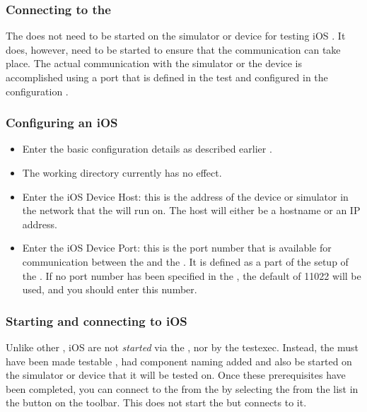 

\subsubsection{Connecting to the \gdagent{}}
The \gdagent{} does not need to be started on the simulator or device for testing iOS \gdauts{}. It does, however, need to be started to ensure that the communication can take place.  The actual communication with the simulator or the device is accomplished using a port that is defined in the test \gdaut{}  and configured in the \gdaut{} configuration .


\subsubsection{Configuring an iOS \gdaut{}}
\label{TasksiOSAUTConfig}
\begin{itemize}
\item Enter the basic configuration details as described earlier .
\item The working directory currently has no effect.
\item Enter the iOS Device Host: this is the address of the device or simulator in the network that the \gdaut{} will run on. The host will either be a hostname or an IP address. 
\item Enter the iOS Device Port: this is the port number that is available for communication between the \gdaut{} and the \ite{}. It is defined as a part of the setup of the \gdaut{}. If no port number has been specified in the \gdaut{}, the default of 11022 will be used, and you should enter this number. 
\end{itemize}

\subsubsection{Starting and connecting to iOS \gdauts{}}
Unlike other \gdauts{}, iOS \gdauts{} are not \textit{started} via the \ite{}, nor by the testexec. Instead, the \gdaut{} must have been made testable , had component naming added  and also be started on the simulator or device that it will be tested on. 
Once these prerequisites have been completed, you can connect to the \gdaut{} from the \ite{} by selecting the \gdaut{} from the list in the  button on the toolbar. This does not start the \gdaut{} but connects to it. 
